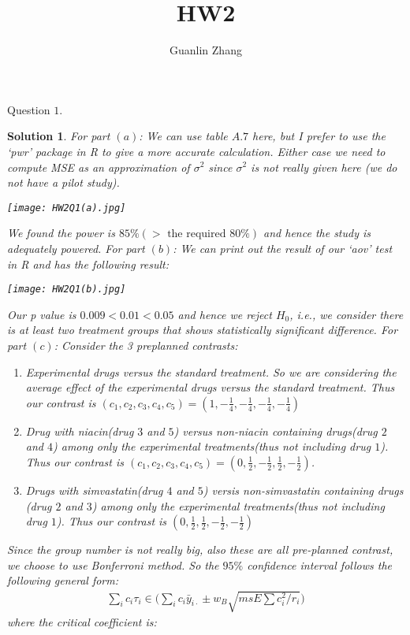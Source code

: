 \documentclass[11pt]{article}
\title{HW2}
\author{Guanlin Zhang}
\newtheorem{sol}{Solution}
\begin{document}
Question $1$.
\begin{sol}
	For part $(a)$:\vskip 2mm
	We can use table $A.7$ here, but I prefer to use the `pwr' package in R to give a more accurate calculation. Either case we need to compute MSE as an approximation of $\sigma^2$ since $\sigma^2$ is not really given here (we do not have a pilot study).\vskip 2mm
	\begin{center}
		\texttt{[image: HW2Q1(a).jpg]}
	\end{center}
	We found the power is $85\%(> \text{ the required }80\% )$ and hence the study is adequately powered.\vskip 2mm
	For part $(b)$:\vskip 2mm
	We can print out the result of our `aov' test in R and has the following result:
	\begin{center}
		\texttt{[image: HW2Q1(b).jpg]}
	\end{center}
	Our p value is $0.009<0.01<0.05$ and hence we reject $H_0$, i.e., we consider there is at least two treatment groups that shows statistically significant difference.\vskip 2mm
	For part $(c)$:\vskip 2mm
	Consider the 3 preplanned contrasts:
	\begin{enumerate}
		\item [(1)]Experimental drugs versus the standard treatment. So we are considering the average effect of the experimental drugs versus the standard treatment. Thus our contrast is $(c_1, c_2, c_3, c_4, c_5) = (1, -\frac{1}{4}, -\frac{1}{4}, -\frac{1}{4}, -\frac{1}{4})$
		\item [(2)]Drug with niacin(drug $3$ and $5$) versus non-niacin containing drugs(drug $2$ and $4$) among only the experimental treatments(thus not including drug $1$). Thus our contrast is $(c_1, c_2, c_3, c_4, c_5) = (0, \frac{1}{2}, -\frac{1}{2}, \frac{1}{2}, -\frac{1}{2})$.
		\item [(3)] Drugs with simvastatin(drug $4$ and $5$) versis non-simvastatin containing drugs (drug $2$ and $3$) among only the experimental treatments(thus not including drug $1$). Thus our contrast is $(0, \frac{1}{2}, \frac{1}{2}, -\frac{1}{2}, -\frac{1}{2})$
	\end{enumerate}
	Since the group number is not really big, also these are all pre-planned contrast, we choose to use Bonferroni method.\vskip 2mm
	So the $95\%$ confidence interval follows the following general form:
	\begin{align*}
		\sum_ic_i\tau_i \in \Big(\sum_ic_i\bar{y}_{i\cdot} \pm w_B\sqrt{msE\sum c_i^2/r_i}\Big)
	\end{align*}
	where the critical coefficient is:

\end{sol}
\end{document}
